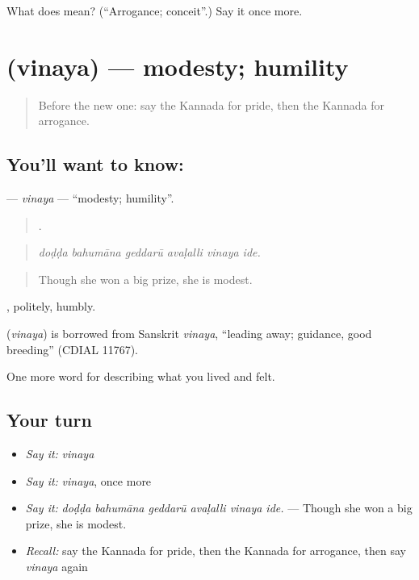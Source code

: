 \begin{tcolorbox}[breakable,colback=teal!4,colframe=teal!35!black,title={Before you move on}]
What does  mean? (\textquotedblleft{}Arrogance; conceit\textquotedblright{}.) Say it once more.
\end{tcolorbox}
\section[\texorpdfstring{\kn{ವಿನಯ} (vinaya)}{ವಿನಯ (vinaya)}]{ (vinaya) — modesty; humility}

\label{lesson:KA-C497-vinaya}



\begin{quote}
Before the new one: say the Kannada for pride, then the Kannada for arrogance.
\end{quote}

\subsection*{You'll want to know: }
\textbf{} — \emph{vinaya} — \textquotedblleft{}modesty; humility\textquotedblright{}.

\begin{quote}
     .
\end{quote}

\begin{quote}
\emph{doḍḍa bahumāna geddarū avaḷalli vinaya ide.}
\end{quote}

\begin{quote}
Though she won a big prize, she is modest.
\end{quote}

, politely, humbly.

\begin{cousinweb}
\textbf{} (\emph{vinaya}) is borrowed from Sanskrit \emph{vinaya}, \textquotedblleft{}leading away; guidance, good breeding\textquotedblright{} (CDIAL 11767).
\end{cousinweb}

\begin{grammarlens}[title={What you've built}]
One more word for describing what you lived and felt.
\end{grammarlens}

\subsection*{Your turn}
\begin{itemize}
\raggedright
  \item \emph{Say it:} \emph{vinaya}
  \item \emph{Say it:} \emph{vinaya}, once more
  \item \emph{Say it:} \emph{doḍḍa bahumāna geddarū avaḷalli vinaya ide.} — Though she won a big prize, she is modest.
  \item \emph{Recall:} say the Kannada for pride, then the Kannada for arrogance, then say \emph{vinaya} again
\end{itemize}

